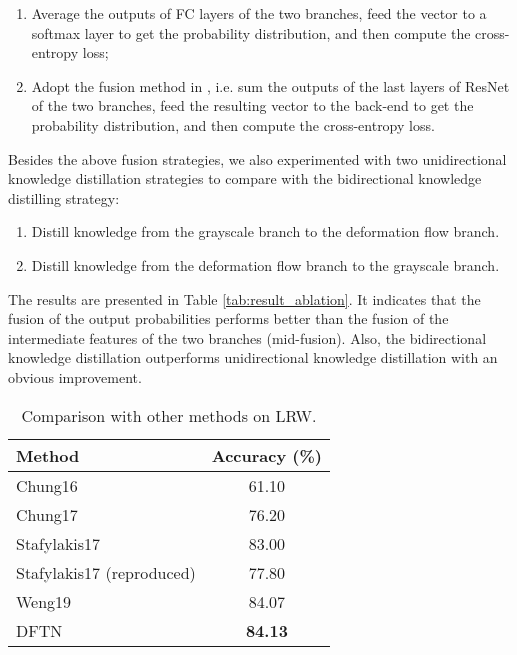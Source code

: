 \documentclass[a4paper, 10pt, conference]{ieeeconf}      \usepackage{FG2020}
\begin{document}
    \begin{enumerate}[]
     \item Average the outputs of FC layers of the two branches, feed the vector to a softmax layer to get the probability distribution, and then compute the cross-entropy loss;
     \item Adopt the fusion method in \cite{weng2019importance}, i.e. sum the outputs of the last layers of ResNet of the two branches, feed the resulting vector to the back-end to get the probability distribution, and then compute the cross-entropy loss.
     \end{enumerate}
	 Besides the above fusion strategies, we also experimented with two unidirectional knowledge distillation strategies to compare with the bidirectional knowledge distilling strategy:
 
     \begin{enumerate}[]
       \item Distill knowledge from the grayscale branch to the deformation flow branch.
       \item Distill knowledge from the deformation flow branch to the grayscale branch.
       \end{enumerate}
   
       The results are presented in Table \ref{tab:result_ablation}. It indicates that the fusion of the output probabilities performs better than the fusion of the intermediate features of the two branches (mid-fusion). Also, the bidirectional knowledge distillation outperforms unidirectional knowledge distillation with an obvious improvement. 
     




\begin{table}
     \caption{Comparison with other methods on LRW.  }
       \label{tab:comp_LRW}
       \begin{center}
       \begin{tabular}{|l|c|}
       \hline
       Method & Accuracy (\%) \\
       \hline\hline
      Chung16 \cite{Chung2016LipRI} & 61.10 \\
       Chung17 \cite{chung2017lip} & 76.20 \\
       Stafylakis17 \cite{Stafylakis2017CombiningRN} & 83.00 \\
       Stafylakis17 \cite{Stafylakis2017CombiningRN} (reproduced) & 77.80 \\
Weng19 \cite{weng2019importance} & 84.07 \\
DFTN & \textbf{84.13} \\
       \hline
       \end{tabular}
       \end{center}
       \vspace{-0.4cm}
       \end{table}
\end{document}
